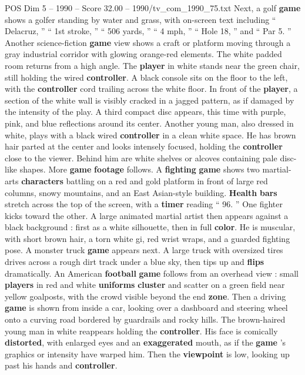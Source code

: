 \begin{textsample}{POS Dim 5 – 1990 – Score 32.00 – 1990/tv\_com\_1990\_75.txt}
Next, a golf \textbf{game} shows a golfer standing by water and grass, with on-screen text including “ Delacruz, ” “ 1st stroke, ” “ 506 yards, ” “ 4 mph, ” “ Hole 18, ” and “ Par 5. ” Another science-fiction \textbf{game} view shows a craft or platform moving through a gray industrial corridor with glowing orange-red elements.
The white padded room returns from a high angle.
The \textbf{player} in white stands near the green chair, still holding the wired \textbf{controller}.
A black console sits on the floor to the left, with the \textbf{controller} cord trailing across the white floor.
In front of the \textbf{player}, a section of the white wall is visibly cracked in a jagged pattern, as if damaged by the intensity of the play.
A third compact disc appears, this time with purple, pink, and blue reflections around its center.
Another young man, also dressed in white, plays with a black wired \textbf{controller} in a clean white space.
He has brown hair parted at the center and looks intensely focused, holding the \textbf{controller} close to the viewer.
Behind him are white shelves or alcoves containing pale disc-like shapes.
More \textbf{game} \textbf{footage} follows.
A \textbf{fighting} \textbf{game} shows two martial-arts \textbf{characters} battling on a red and gold platform in front of large red columns, snowy mountains, and an East Asian-style building. \textbf{Health} \textbf{bars} stretch across the top of the screen, with a \textbf{timer} reading “ 96. ” One fighter kicks toward the other.
A large animated martial artist then appears against a black background : first as a white silhouette, then in full \textbf{color}.
He is muscular, with short brown hair, a torn white gi, red wrist wraps, and a guarded fighting pose.
A monster truck \textbf{game} appears next.
A large truck with oversized tires drives across a rough dirt track under a blue sky, then tips up and \textbf{flips} dramatically.
An American \textbf{football} \textbf{game} follows from an overhead view : small \textbf{players} in red and white \textbf{uniforms} \textbf{cluster} and scatter on a green field near yellow goalposts, with the crowd visible beyond the end \textbf{zone}.
Then a driving \textbf{game} is shown from inside a car, looking over a dashboard and steering wheel onto a curving road bordered by guardrails and rocky hills.
The brown-haired young man in white reappears holding the \textbf{controller}.
His face is comically \textbf{distorted}, with enlarged eyes and an \textbf{exaggerated} mouth, as if the \textbf{game} ’s graphics or intensity have warped him.
Then the \textbf{viewpoint} is low, looking up past his hands and \textbf{controller}.

\end{textsample}
